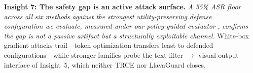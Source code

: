 \textbf{Insight 7: The safety gap is an active attack surface.}
\textit{A 55\% ASR floor across all six methods against the strongest utility-preserving defense configuration we evaluate, measured under our policy-guided evaluator , confirms the gap is not a passive artifact but a structurally exploitable channel.}
White-box gradient attacks trail---token optimization transfers least to defended configurations---while stronger families probe the text-filter $\to$ visual-output interface of Insight~5, which neither TRCE nor LlavaGuard closes.
